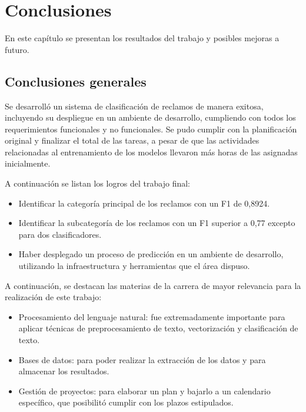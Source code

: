 
\chapter{Conclusiones} %

\label{Chapter5} %

En este capítulo se presentan los resultados del trabajo y posibles mejoras a futuro.

\section{Conclusiones generales}

Se desarrolló un sistema de clasificación de reclamos de manera exitosa, incluyendo su despliegue en un ambiente de desarrollo, cumpliendo con todos los requerimientos funcionales y no funcionales. Se pudo cumplir con la planificación original y finalizar el total de las tareas, a pesar de que las actividades relacionadas al entrenamiento de los modelos llevaron más horas de las asignadas inicialmente.

A continuación se listan los logros del trabajo final:
\begin{itemize}
	\item Identificar la categoría principal de los reclamos con un F1 de 0,8924.
	\item Identificar la subcategoría de los reclamos con un F1 superior a 0,77 excepto para dos clasificadores.
	\item Haber desplegado un proceso de predicción en un ambiente de desarrollo, utilizando la infraestructura y herramientas que el área dispuso.
\end{itemize}

A continuación, se destacan las materias de la carrera de mayor relevancia para la realización de este trabajo:
\begin{itemize}
	\item Procesamiento del lenguaje natural: fue extremadamente importante para aplicar técnicas de preprocesamiento de texto, vectorización y clasificación de texto.
	\item Bases de datos: para poder realizar la extracción de los datos y para almacenar los resultados.
	\item Gestión de proyectos: para elaborar un plan y bajarlo a un calendario específico, que posibilitó cumplir con los plazos estipulados.
\end{itemize}


